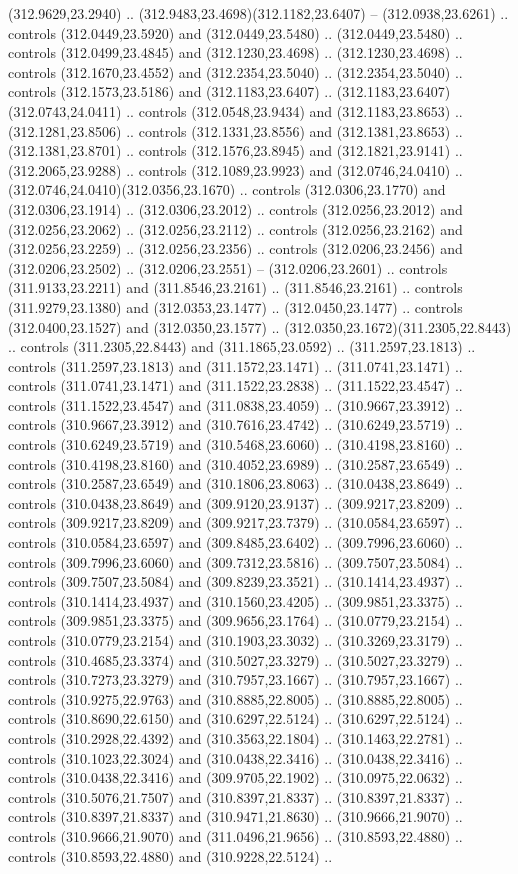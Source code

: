(312.9629,23.2940) .. (312.9483,23.4698)(312.1182,23.6407) -- (312.0938,23.6261) .. controls (312.0449,23.5920) and (312.0449,23.5480) .. (312.0449,23.5480) .. controls (312.0499,23.4845) and (312.1230,23.4698) .. (312.1230,23.4698) .. controls (312.1670,23.4552) and (312.2354,23.5040) .. (312.2354,23.5040) .. controls (312.1573,23.5186) and (312.1183,23.6407) .. (312.1183,23.6407)(312.0743,24.0411) .. controls (312.0548,23.9434) and (312.1183,23.8653) .. (312.1281,23.8506) .. controls (312.1331,23.8556) and (312.1381,23.8653) .. (312.1381,23.8701) .. controls (312.1576,23.8945) and (312.1821,23.9141) .. (312.2065,23.9288) .. controls (312.1089,23.9923) and (312.0746,24.0410) .. (312.0746,24.0410)(312.0356,23.1670) .. controls (312.0306,23.1770) and (312.0306,23.1914) .. (312.0306,23.2012) .. controls (312.0256,23.2012) and (312.0256,23.2062) .. (312.0256,23.2112) .. controls (312.0256,23.2162) and (312.0256,23.2259) .. (312.0256,23.2356) .. controls (312.0206,23.2456) and (312.0206,23.2502) .. (312.0206,23.2551) -- (312.0206,23.2601) .. controls (311.9133,23.2211) and (311.8546,23.2161) .. (311.8546,23.2161) .. controls (311.9279,23.1380) and (312.0353,23.1477) .. (312.0450,23.1477) .. controls (312.0400,23.1527) and (312.0350,23.1577) .. (312.0350,23.1672)(311.2305,22.8443) .. controls (311.2305,22.8443) and (311.1865,23.0592) .. (311.2597,23.1813) .. controls (311.2597,23.1813) and (311.1572,23.1471) .. (311.0741,23.1471) .. controls (311.0741,23.1471) and (311.1522,23.2838) .. (311.1522,23.4547) .. controls (311.1522,23.4547) and (311.0838,23.4059) .. (310.9667,23.3912) .. controls (310.9667,23.3912) and (310.7616,23.4742) .. (310.6249,23.5719) .. controls (310.6249,23.5719) and (310.5468,23.6060) .. (310.4198,23.8160) .. controls (310.4198,23.8160) and (310.4052,23.6989) .. (310.2587,23.6549) .. controls (310.2587,23.6549) and (310.1806,23.8063) .. (310.0438,23.8649) .. controls (310.0438,23.8649) and (309.9120,23.9137) .. (309.9217,23.8209) .. controls (309.9217,23.8209) and (309.9217,23.7379) .. (310.0584,23.6597) .. controls (310.0584,23.6597) and (309.8485,23.6402) .. (309.7996,23.6060) .. controls (309.7996,23.6060) and (309.7312,23.5816) .. (309.7507,23.5084) .. controls (309.7507,23.5084) and (309.8239,23.3521) .. (310.1414,23.4937) .. controls (310.1414,23.4937) and (310.1560,23.4205) .. (309.9851,23.3375) .. controls (309.9851,23.3375) and (309.9656,23.1764) .. (310.0779,23.2154) .. controls (310.0779,23.2154) and (310.1903,23.3032) .. (310.3269,23.3179) .. controls (310.4685,23.3374) and (310.5027,23.3279) .. (310.5027,23.3279) .. controls (310.7273,23.3279) and (310.7957,23.1667) .. (310.7957,23.1667) .. controls (310.9275,22.9763) and (310.8885,22.8005) .. (310.8885,22.8005) .. controls (310.8690,22.6150) and (310.6297,22.5124) .. (310.6297,22.5124) .. controls (310.2928,22.4392) and (310.3563,22.1804) .. (310.1463,22.2781) .. controls (310.1023,22.3024) and (310.0438,22.3416) .. (310.0438,22.3416) .. controls (310.0438,22.3416) and (309.9705,22.1902) .. (310.0975,22.0632) .. controls (310.5076,21.7507) and (310.8397,21.8337) .. (310.8397,21.8337) .. controls (310.8397,21.8337) and (310.9471,21.8630) .. (310.9666,21.9070) .. controls (310.9666,21.9070) and (311.0496,21.9656) .. (310.8593,22.4880) .. controls (310.8593,22.4880) and (310.9228,22.5124) .. 